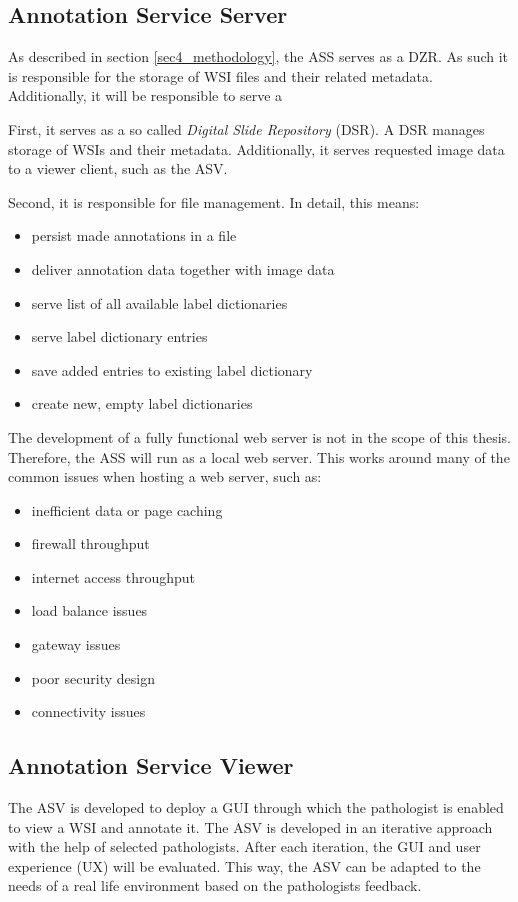\subsection{Annotation Service Server}
\label{sec4_assPart}
As described in section \ref{sec4_methodology}, the ASS serves as a DZR. As such it is responsible for the storage of WSI files and their related metadata\cite{Cornish13}. Additionally, it will be responsible to serve a

First, it serves as a so called \emph{Digital Slide Repository} (DSR). A DSR manages storage of WSIs and their metadata. Additionally, it serves requested image data to a viewer client\cite{Cornish13}, such as the ASV. 

Second, it is responsible for file management. In detail, this means:
\begin{itemize}
	\item persist made annotations in a file
	\item deliver annotation data together with image data
	\item serve list of all available label dictionaries
	\item serve label dictionary entries
	\item save added entries to existing label dictionary
	\item create new, empty label dictionaries
\end{itemize} 

The development of a fully functional web server is not in the scope of this thesis. Therefore, the ASS will run as a local web server. This works around many of the common issues when hosting a web server\cite{web:typicalissues}, such as:

\begin{itemize}
	\item inefficient data or page caching
	\item firewall throughput
	\item internet access throughput
	\item load balance issues
	\item gateway issues
	\item poor security design
	\item connectivity issues
\end{itemize}


\subsection{Annotation Service Viewer}
\label{sec4_asvPart}
The ASV is developed to deploy a GUI through which the pathologist is enabled to view a WSI and annotate it. The ASV is developed in an iterative approach with the help of selected pathologists. After each iteration, the GUI and user experience (UX) will be evaluated. This way, the ASV can be adapted to the needs of a real life environment based on the pathologists feedback.

